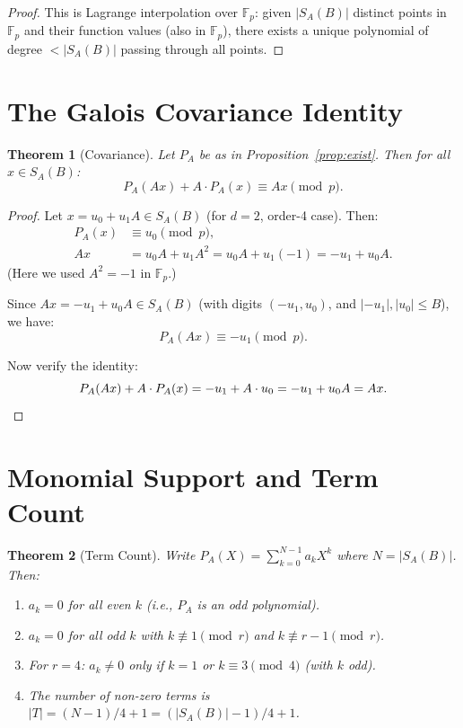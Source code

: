 \documentclass[11pt]{article}
\newtheorem{theorem}{Theorem}
\newcommand{\Fp}{\mathbb{F}_p}
\begin{document}
\begin{proof}
This is Lagrange interpolation over $\Fp$: given $|S_A(B)|$ distinct points in $\Fp$ and their function values (also in $\Fp$), there exists a unique polynomial of degree $< |S_A(B)|$ passing through all points.
\end{proof}

\section{The Galois Covariance Identity}

\begin{theorem}[Covariance]\label{thm:cov}
Let $P_A$ be as in Proposition~\ref{prop:exist}. Then for all $x \in S_A(B)$:
\[
P_A(Ax) + A \cdot P_A(x) \equiv Ax \pmod{p}.
\]
\end{theorem}

\begin{proof}
Let $x = u_0 + u_1 A \in S_A(B)$ (for $d=2$, order-4 case). Then:
\begin{align*}
P_A(x) &\equiv u_0 \pmod{p}, \\
Ax &= u_0 A + u_1 A^2 = u_0 A + u_1(-1) = -u_1 + u_0 A.
\end{align*}
(Here we used $A^2 = -1$ in $\Fp$.)

Since $Ax = -u_1 + u_0 A \in S_A(B)$ (with digits $(-u_1, u_0)$, and $|-u_1|, |u_0| \leq B$), we have:
\[
P_A(Ax) \equiv -u_1 \pmod{p}.
\]

Now verify the identity:
\[
P_A(Ax) + A \cdot P_A(x) = -u_1 + A \cdot u_0 = -u_1 + u_0 A = Ax. \qedhere
\]
\end{proof}

\section{Monomial Support and Term Count}

\begin{theorem}[Term Count]\label{thm:terms}
Write $P_A(X) = \sum_{k=0}^{N-1} a_k X^k$ where $N = |S_A(B)|$. Then:
\begin{enumerate}[label=(\roman*)]
\item $a_k = 0$ for all even $k$ (i.e., $P_A$ is an odd polynomial).
\item $a_k = 0$ for all odd $k$ with $k \not\equiv 1 \pmod{r}$ and $k \not\equiv r-1 \pmod{r}$.
\item For $r = 4$: $a_k \neq 0$ only if $k = 1$ or $k \equiv 3 \pmod{4}$ (with $k$ odd).
\item The number of non-zero terms is $|T| = (N-1)/4 + 1 = (|S_A(B)|-1)/4 + 1$.
\end{enumerate}
\end{theorem}
\end{document}
